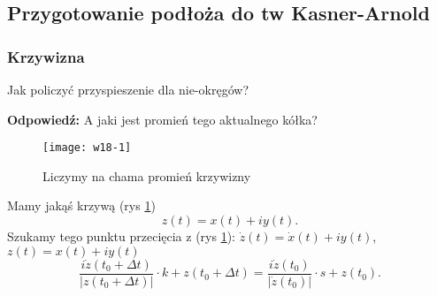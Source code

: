 \documentclass[../main.tex]{subfiles}
\begin{document}
    \subsection{Przygotowanie podłoża do tw Kasner-Arnold}
    \subsubsection{Krzywizna}
    \begin{pytanie}
        Jak policzyć przyspieszenie dla nie-okręgów?
    \end{pytanie}
    \textbf{Odpowiedź: }A jaki jest promień tego aktualnego kółka?
    \begin{figure}[h]
        \centering
        \texttt{[image: w18-1]}
        \caption{Liczymy na chama promień krzywizny}
        \label{fig:w18-1}
    \end{figure}
        Mamy jakąś krzywą (rys \ref{fig:w18-1})
        \[
            z(t) = x(t) + iy(t)
        .\]
    Szukamy tego punktu przecięcia z (rys \ref{fig:w18-1}): $\dot{z}(t) = \dot{x}(t) + i y(t)$, $z(t) = x(t) + iy(t)$
     \[
         \frac{i\dot{z}(t_0 + \Delta t)}{\left|z(t_0 + \Delta t)\right|} \cdot k + z(t_0 + \Delta t) = \frac{i\dot{z}(t_0)}{\left|\dot{z}(t_0)\right|}\cdot s + z(t_0)
    .\]
\end{document}
